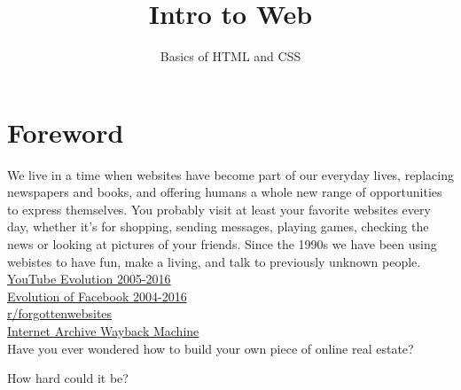 \documentclass{42-en}
\begin{document}
                           \title{Intro to Web}
                          \subtitle{Basics of HTML and CSS}


\maketitle

\tableofcontents


\chapter{Foreword}

    We live in a time when websites have become part of our everyday lives, replacing newspapers and books, and offering humans a whole new range of opportunities to express themselves. You probably visit at least your favorite websites every day, whether it's for shopping, sending messages, playing games, checking the news or looking at pictures of your friends. Since the 1990s we have been using webistes to have fun, make a living, and talk to previously unknown people.\\

    \href{https://www.youtube.com/watch?v=aVIy54CtWXM}{YouTube Evolution 2005-2016}\\

    \href{https://www.youtube.com/watch?v=3ZD4l94IxrU}{Evolution of Facebook 2004-2016}\\

    \href{https://www.reddit.com/r/forgottenwebsites/}{r/forgottenwebsites}\\

    \href{https://archive.org/web/}{Internet Archive Wayback Machine}\\

    Have you ever wondered how to build your own piece of online real estate?

    How hard could it be?\\
\end{document}
